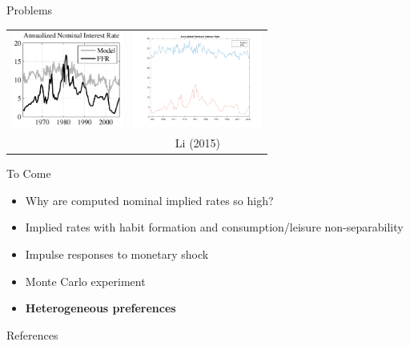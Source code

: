 \documentclass{beamer}
\begin{document}
\begin{frame}{Problems}
\begin{center}
\begin{tabular}{cc}
\includegraphics[height=120px]{crra-nominal_collard.png} &
\includegraphics[height=120px]{crra-nominal.png} \\
\cite{collard11} & Li (2015)
\end{tabular}
\end{center}
\end{frame}

\begin{frame}{To Come}
\begin{itemize}
\item Why are computed nominal implied rates so high?
\item Implied rates with habit formation and consumption/leisure non-separability
\item Impulse responses to monetary shock
\item Monte Carlo experiment
\item \textbf{Heterogeneous preferences}
\end{itemize}
\end{frame}

\begin{frame}{References}


\end{frame}
\end{document}
